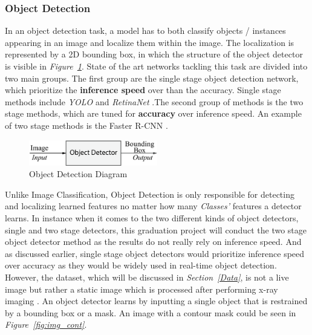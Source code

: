 \documentclass[12pt]{extarticle}
\begin{document}
	\subsubsection{Object Detection}\label{Obj Detection}
	In an object detection task, a model has to both classify objects / instances appearing in an image and localize them within the image. The localization is represented by a 2D bounding box, in which the structure of the object detector is visible in \emph{Figure~\ref{fig:Obj Detector}}. State of the art networks tackling this task are divided into two main groups. The first group are the single stage object detection network, which prioritize the \textbf{inference speed} over than the accuracy. Single stage methods include \emph{YOLO} \cite{Objdet2} and \emph{RetinaNet} \cite{Retina}.The second group of methods is the two stage methods, which are tuned for \textbf{accuracy} over inference speed. An example of two stage methods is the Faster R-CNN \cite{Objdet}.
	\begin{figure}[h]
		\centering
		\includegraphics[width=0.5\textwidth]{pics/Figures/Obj_Det_Block_Diagram.eps}
		\caption{\small{Object Detection Diagram}}
		\label{fig:Obj Detector}
	\end{figure}
	Unlike Image Classification, Object Detection is only responsible for detecting and localizing learned features no matter how many \emph{Classes'} features a detector learns. In instance when it comes to the two different kinds of object detectors, single and two stage detectors, this graduation project will conduct the two stage object detector method as the results do not really rely on inference speed. And as discussed earlier, single stage object detectors would prioritize inference speed over accuracy as they would be widely used in real-time object detection. However, the dataset, which will be discussed in \emph{Section~\ref{Data}}, is not a live image but rather a static image which is processed after performing x-ray imaging \cite{mammography}. An object detector learns by inputting a single object that is restrained by a bounding box or a mask. An image with a contour mask could be seen in \emph{Figure~\ref{fig:img_cont}}.
\end{document}
